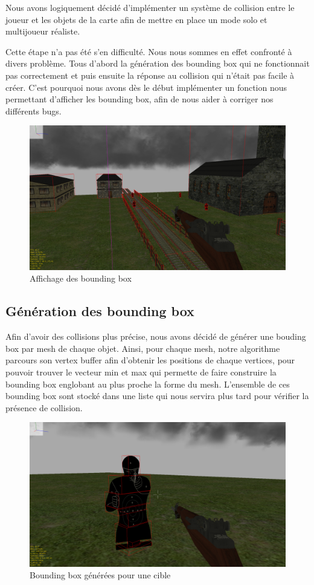 \documentclass[11pt]{report}
\begin{document}
Nous avons logiquement décidé d’implémenter un système de collision entre le joueur et les objets de la carte afin de mettre en place un mode solo et multijoueur réaliste.

Cette étape n'a pas été s'en difficulté. Nous nous sommes en effet confronté à divers problème. Tous d'abord la génération des bounding box qui ne fonctionnait pas correctement et puis ensuite la réponse au collision qui n'était pas facile à créer. C'est pourquoi nous avons dès le début implémenter un fonction nous permettant d'afficher les bounding box, afin de nous aider à corriger nos différents bugs.

\begin{figure}[htbp]
\centering
\includegraphics[scale=0.13]{affichage-box.png}
\caption{Affichage des bounding box}
\end{figure}

\subsection{Génération des bounding box}

Afin d'avoir des collisions plus précise, nous avons décidé de générer une bouding box par mesh de chaque objet. Ainsi, pour chaque mesh, notre algorithme parcours son vertex buffer afin d'obtenir les positions de chaque vertices, pour pouvoir trouver le vecteur min et max qui permette de faire construire la bounding box englobant au plus proche la forme du mesh. L'ensemble de ces bounding box sont stocké dans une liste qui nous servira plus tard pour vérifier la présence de collision.

\begin{figure}[htbp]
\centering
\includegraphics[scale=0.13]{multiple-box.png}
\caption{Bounding box générées pour une cible}
\end{figure}
\end{document}
